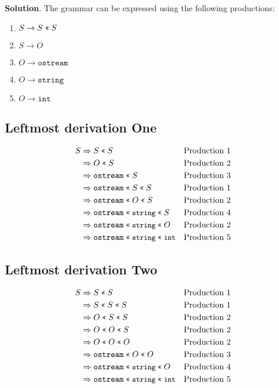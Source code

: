 \textbf{Solution}.
The grammar can be expressed using the following productions:
\begin{enumerate}[noitemsep]
\item \(S \rightarrow S\; \small{\texttt{<<} }\; S\)
\item \(S \rightarrow O\)
\item \(O \rightarrow \texttt{ostream}\)
\item \(O \rightarrow \texttt{string}\)
\item \(O \rightarrow \texttt{int}\)
\end{enumerate}
\subsection{Leftmost derivation One}
\begin{align*}
S & \Rightarrow S\; \small{\texttt{<<} }\; S && \text{Production 1}  \\
  & \Rightarrow O\; \small{\texttt{<<} }\; S && \text{Production 2} \\
  & \Rightarrow \texttt{ostream}\; \small{\texttt{<<} }\; S\; && \text{Production 3} \\
  & \Rightarrow \texttt{ostream}\; \small{\texttt{<<} }\; S\; \small{\texttt{<<} }\; S  && \text{Production 1} \\
  & \Rightarrow \texttt{ostream}\; \small{\texttt{<<} }\; O\; \small{\texttt{<<} }\; S  && \text{Production 2} \\
  & \Rightarrow \texttt{ostream}\; \small{\texttt{<<} }\; \texttt{string}\; \small{\texttt{<<} }\; S  && \text{Production 4} \\
  & \Rightarrow \texttt{ostream}\; \small{\texttt{<<} }\; \texttt{string}\; \small{\texttt{<<} }\; O && \text{Production 2} \\
  & \Rightarrow \texttt{ostream}\; \small{\texttt{<<} }\; \texttt{string}\; \small{\texttt{<<} }\; \texttt{int} && \text{Production 5}
\end{align*}
\subsection{Leftmost derivation Two}
\begin{align*}
S & \Rightarrow S\; \small{\texttt{<<} }\; S && \text{Production 1}  \\
  & \Rightarrow S\; \small{\texttt{<<} }\; S\; \small{\texttt{<<} }\; S && \text{Production 1} \\
  & \Rightarrow O\; \small{\texttt{<<} }\; S\; \small{\texttt{<<} }\; S && \text{Production 2} \\
  & \Rightarrow O\; \small{\texttt{<<} }\; O\; \small{\texttt{<<} }\; S && \text{Production 2} \\
  & \Rightarrow O\; \small{\texttt{<<} }\; O\; \small{\texttt{<<} }\; O && \text{Production 2} \\
  & \Rightarrow \texttt{ostream}\; \small{\texttt{<<} }\; O\; \small{\texttt{<<} }\; O  && \text{Production 3} \\
  & \Rightarrow \texttt{ostream}\; \small{\texttt{<<} }\; \texttt{string}\; \small{\texttt{<<} }\; O  && \text{Production 4} \\
  & \Rightarrow \texttt{ostream}\; \small{\texttt{<<} }\; \texttt{string}\; \small{\texttt{<<} }\; \texttt{int}  && \text{Production 5}
\end{align*}
